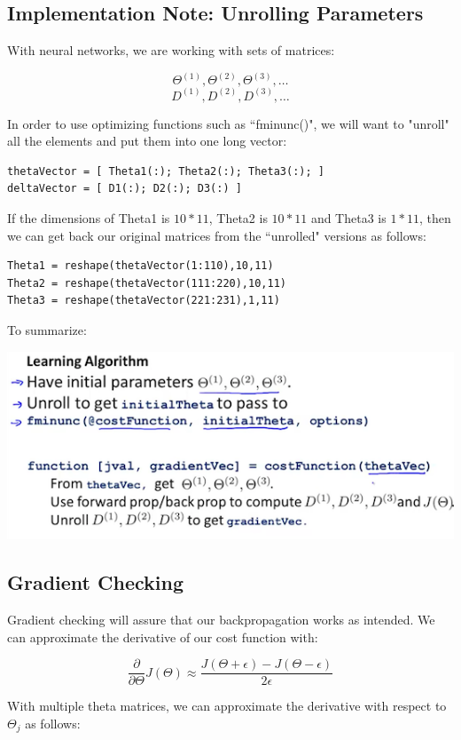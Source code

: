 \documentclass[UTF8]{article}
\begin{document}
\subsection{Implementation Note: Unrolling Parameters}

With neural networks, we are working with sets of matrices:

\[\Theta^{(1)}, \Theta^{(2)}, \Theta^{(3)}, \dots \]
\[D^{(1)}, D^{(2)}, D^{(3)}, \dots \]

In order to use optimizing functions such as ``fminunc()", we will want to "unroll" all the elements and put them into one long vector:

\begin{lstlisting}
thetaVector = [ Theta1(:); Theta2(:); Theta3(:); ]
deltaVector = [ D1(:); D2(:); D3(:) ]
\end{lstlisting}

If the dimensions of Theta1 is $10*11$, Theta2 is $10*11$ and Theta3 is $1*11$, then we can get back our original matrices from the ``unrolled" versions as follows:

\begin{lstlisting}
Theta1 = reshape(thetaVector(1:110),10,11)
Theta2 = reshape(thetaVector(111:220),10,11)
Theta3 = reshape(thetaVector(221:231),1,11)
\end{lstlisting}

To summarize:

\includegraphics[width = .8\textwidth]{NotePics/9_4_1.png}

\subsection{Gradient Checking}

Gradient checking will assure that our backpropagation works as intended. We can approximate the derivative of our cost function with:

\[\dfrac{\partial}{\partial\Theta}J(\Theta) \approx \dfrac{J(\Theta + \epsilon) - J(\Theta - \epsilon)}{2\epsilon}\]

With multiple theta matrices, we can approximate the derivative with respect to $\Theta_j$ as follows:
\end{document}
